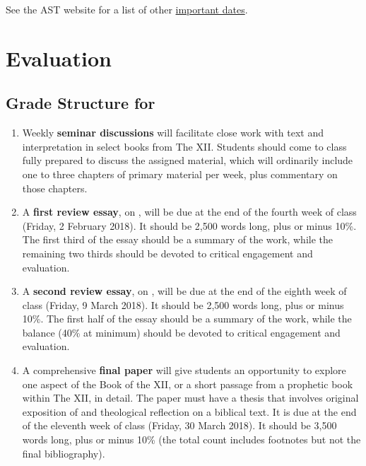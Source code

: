 \documentclass[titlepage]{article}
\begin{document}
See the AST website for a list of other \href{http://www.astheology.ns.ca/students/academic-dates.html}{important dates}.

\section{Evaluation}
\label{evaluation}

\subsection{Grade Structure for \ccode}
\label{structure}

\begin{enumerate}

	\item Weekly \textbf{seminar discussions} will facilitate close work
	with text and interpretation in select books from The XII. Students
	should come to class fully prepared to discuss the assigned
	material, which will ordinarily include one to three chapters of
	primary material per week, plus commentary on those chapters.

	\item A \textbf{first review essay}, on \cite{Two}, will be due at
	the end of the fourth week of class (Friday, 2 February 2018). It
	should be 2,500 words long, plus or minus 10\%. The first third of
	the essay should be a summary of the work, while the remaining two
	thirds should be devoted to critical engagement and evaluation.

	\item A \textbf{second review essay}, on \cite{Seitz}, will be due
	at the end of the eighth week of class (Friday, 9 March 2018). It
	should be 2,500 words long, plus or minus 10\%. The first half of
	the essay should be a summary of the work, while the balance (40\%
	at minimum) should be devoted to critical engagement and evaluation.

	\item A comprehensive \textbf{final paper} will give students an
	opportunity to explore one aspect of the Book of the XII, or a short
	passage from a prophetic book within The XII, in detail. The paper
	must have a thesis that involves original exposition of and
	theological reflection on a biblical text. It is due at the end of
	the eleventh week of class (Friday, 30 March 2018). It should be
	3,500 words long, plus or minus 10\% (the total count includes
	footnotes but not the final bibliography).

\end{enumerate}
\end{document}
